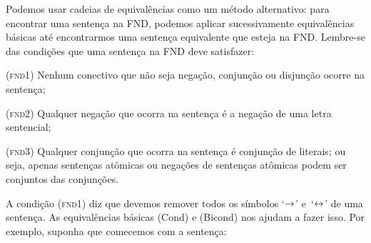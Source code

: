 Podemos usar cadeias de equivalências como um método alternativo: para encontrar uma sentença na FND,  podemos aplicar sucessivamente equivalências básicas até encontrarmos uma sentença equivalente que esteja na FND. Lembre-se das condições que uma sentença na FND deve satisfazer:
\begin{earg}
	\item[(\textsc{fnd1})] Nenhum conectivo que não seja negação, conjunção ou disjunção ocorre na sentença;
	\item[(\textsc{fnd2})] Qualquer negação que ocorra na sentença é a negação de uma letra sentencial;
	\item[(\textsc{fnd3})] Qualquer conjunção que ocorra na sentença é conjunção de literais; ou seja, apenas sentenças atômicas ou negações de sentenças atômicas podem ser conjuntos das conjunções.
\end{earg}
A condição (\textsc{fnd1}) diz que devemos remover todos os símbolos `$\rightarrow$' e~`$\leftrightarrow$' de uma sentença. As equivalências básicas (Cond) e (Bicond) nos ajudam a fazer isso. Por exemplo, suponha que comecemos com a sentença:
